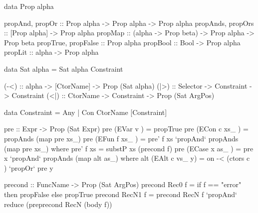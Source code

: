 \begin{code}
data Prop alpha

propAnd, propOr           :: Prop alpha -> Prop alpha -> Prop alpha
propAnds, propOrs         :: [Prop alpha] -> Prop alpha
propMap                   :: (alpha -> Prop beta) -> Prop alpha -> Prop beta
propTrue, propFalse       :: Prop alpha
propBool                  :: Bool -> Prop alpha
propLit                   :: alpha -> Prop alpha
\end{code}

\begin{code}
data Sat alpha = Sat alpha Constraint

(-<)  :: alpha -> [CtorName] -> Prop (Sat alpha)
(|>)  :: Selector -> Constraint -> Constraint
(<|)  :: CtorName -> Constraint -> Prop (Sat ArgPos)
\end{code}


\begin{code}
data Constraint  =  Any
                 |  Con CtorName [Constraint]
\end{code}

\begin{code}
pre ::  Expr -> Prop (Sat Expr)
pre (EVar v       ) = propTrue
pre (ECon c xs_   ) = propAnds (map pre xs_)
pre (EFun f xs_   ) = pre' f xs `propAnd` propAnds (map pre xs_)
    where pre' f xs = substP xs (precond f)
pre (ECase x as_  ) = pre x `propAnd` propAnds (map alt as_)
    where alt (EAlt c vs_ y) = on -< (ctors c \\ [c]) `propOr` pre y
\end{code}

\ignore\begin{code}
precond  :: FuncName -> Prop (Sat ArgPos)
precond Rec0   f =  if f == "error" then propFalse else propTrue
precond RecN1  f =  precond RecN f `propAnd` reduce (pre{precond RecN} (body f))
\end{code}


